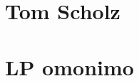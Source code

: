 \documentclass[class=book, crop=false, oneside, 12pt]{standalone}
\begin{document}
\section{Tom Scholz}


\section{LP omonimo}
\end{document}
